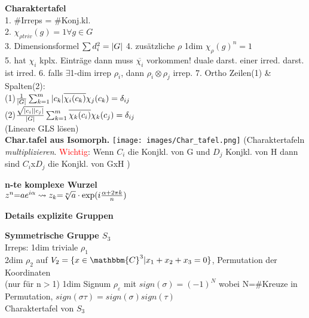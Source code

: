 \documentclass[8pt, a4paper, landscape]{extarticle}
\newcommand{\tit}[1]{\textbf{#1} \\}
\newcommand{\sh}[1]{\small\textbf{#1}}
\newcommand{\eq}{\negthickspace=\negthickspace}
\newcommand{\hi}[1]{\textcolor{Cerulean}{#1}}
\newcommand{\re}[1]{\textcolor{red}{#1}}
\begin{document}
\begin{multicols*}{5}
\begin{ibox}
    \tit{Charaktertafel}
    1. \#Irreps = \#Konj.kl.\\
    2. $\chi_{\rho triv}(g)=1 \forall g\in G$\\
    3. \hi{Dimensionsformel} $\sum d_i^2 = \abs{G}$
    4. zusätzliche $\rho$ 1dim $\chi_\rho(g)^n = 1$\\
    5. hat $\chi_i$ kplx. Einträge dann muss $\overline{\chi_i}$ vorkommen! \hi{duale darst. einer irred. darst. ist irred.}
    6. falls $\exists$1-dim irrep $\rho_i$, dann $\rho_i\otimes\rho_j$ irrep.
    7. Ortho Zeilen(1) \& Spalten(2):\\ (1)$\frac{1}{\abs{G}}\sum_{k=1}^m\abs{c_k} \overline{\chi_i(c_k)}\chi_j(c_k)= \delta_{ij}$\\
    (2)$\frac{\sqrt{\abs{c_i}\abs{c_j}}}{\abs{G}}\sum_{k=1}^m \overline{\chi_k(c_i)}\chi_k(c_j)= \delta_{ij}$\\
    (Lineare GLS lösen)\\
    \textbf{Char.tafel aus Isomorph.}
    \texttt{[image: images/Char\_tafel.png]}
    (Charaktertafeln \textit{multiplizieren}. \re{Wichtig}: Wenn $C_i$ die Konjkl. von G und $D_j$ Konjkl. von H dann sind $C_i$x$D_j$ die Konjkl. von GxH )
\end{ibox}
\begin{ibox}
\tit{n-te komplexe Wurzel}
$z^n\eq ae^{i\alpha}\rightsquigarrow z_k\eq\sqrt[n]{a}\cdot \text{exp}(i{\frac{\alpha+2\pi k}{n}})$
\end{ibox}

\begin{cbox}
    \sh{Details explizite Gruppen}
\end{cbox}
\begin{ibox}
    \tit{Symmetrische Gruppe $S_3$}
    Irreps: \textbullet 1dim triviale $\rho_1$\\
    \textbullet 2dim $\rho_2$ auf $V_2=\{x\in \mathbbm{C}^3|x_1+x_2+x_3=0\}$, Permutation der Koordinaten\\
    \textbullet (nur für n$>$1) 1dim Signum $\rho_\varepsilon$ mit $sign(\sigma)=(-1)^{N}$ wobei N=\#Kreuze in Permutation, $sign(\sigma\tau)=sign(\sigma)sign(\tau)$\\
    \hi{Charaktertafel von $S_3$}\\
    
    \begin{minipage}{0.45\linewidth}
        

\end{minipage}
\end{ibox}
\end{multicols*}
\end{document}
